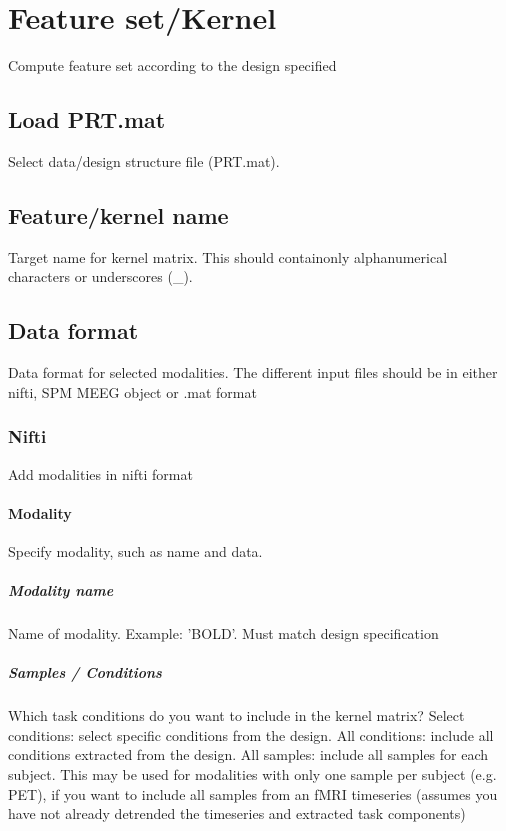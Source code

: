 
\chapter{Feature set/Kernel  \label{Chap:fs}}

\vskip 1.5cm

Compute feature set according to the design specified


\section{Load PRT.mat}
Select data/design structure file (PRT.mat).


\section{Feature/kernel name}
Target name for kernel matrix. This should containonly alphanumerical characters or underscores (\_).


\section{Data format}
Data format for selected modalities. The different input files should be in either nifti, SPM MEEG object or .mat format


\subsection{Nifti}
Add modalities in nifti format


\subsubsection{Modality}
Specify modality, such as name and data.


\paragraph{Modality name}
Name of modality. Example: 'BOLD'. Must match design specification


\paragraph{Samples / Conditions}
Which task conditions do you want to include in the kernel matrix? Select conditions: select specific conditions from the design. All conditions: include all conditions extracted from the design. All samples: include all samples for each subject. This may be used for modalities with only one sample per subject (e.g. PET), if you want to include all samples from an fMRI timeseries (assumes you have not already detrended the timeseries and extracted task components)


